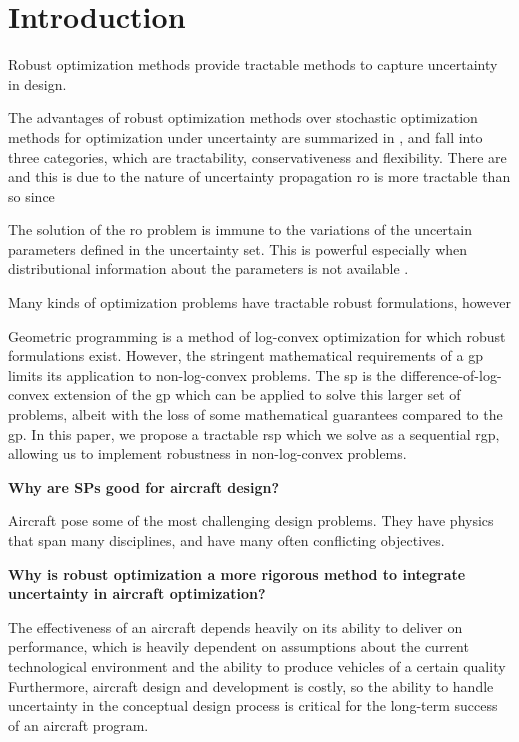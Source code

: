 \section{Introduction}

Robust optimization methods provide tractable methods to capture uncertainty in design.

The advantages of robust optimization methods over stochastic optimization methods
for optimization under uncertainty are summarized in \cite{Bertsimas2011}, 
and fall into three categories, which are tractability, conservativeness and flexibility.
There are
and this is due to the nature of uncertainty propagation
\gls{ro} is more tractable than \gls{so} since

The solution of the \gls{ro} problem is immune to the variations of the uncertain
parameters defined in the uncertainty set. This is powerful especially when distributional
information about the parameters is not available \cite{Bertsimas2011}.

Many kinds of optimization problems have tractable robust formulations, however




Geometric programming is a method of log-convex optimization for which robust formulations exist.
However, the stringent mathematical requirements of a \gls{gp} limits its application to non-log-convex problems.
The \gls{sp} is the difference-of-log-convex extension of the \gls{gp} which can be applied to
solve this larger set of problems, albeit with the loss of some mathematical guarantees compared to the \gls{gp}.
In this paper, we propose a tractable \gls{rsp} which we solve as a sequential \gls{rgp},
allowing us to implement robustness in non-log-convex problems.

\textbf{Why are SPs good for aircraft design?}

Aircraft pose some of the most challenging design problems. They have physics that span many disciplines,
and have many often conflicting objectives.

\textbf{Why is robust optimization a more rigorous method to integrate uncertainty in aircraft optimization?}

The effectiveness of an aircraft depends heavily on its
ability to deliver on performance, which is heavily dependent on assumptions about the
current technological environment and the ability to produce vehicles of a certain quality
Furthermore, aircraft design and development is costly, so the ability to handle uncertainty in
the conceptual design process is critical for the long-term success of an aircraft program.

